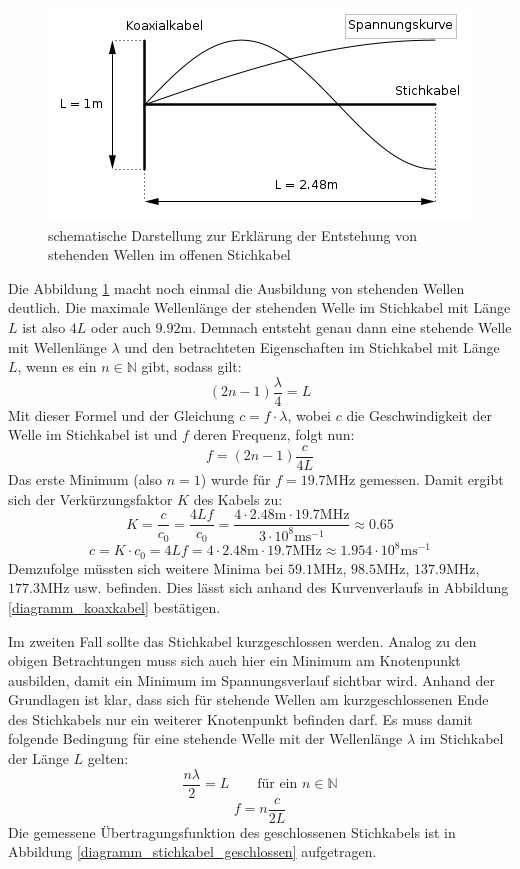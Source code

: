 		\begin{figure}[H]
			\center
			\includegraphics[scale = 0.8]{schema-02.png}
			\caption{\centering schematische Darstellung zur Erklärung der Entstehung von stehenden Wellen im offenen Stichkabel}
			\label{schema-stehende-welle}
		\end{figure}

		Die Abbildung \ref{schema-stehende-welle} macht noch einmal die Ausbildung von stehenden Wellen deutlich.
		Die maximale Wellenlänge der stehenden Welle im Stichkabel mit Länge $L$ ist also $4L$ oder auch $9.92$m.
		Demnach entsteht genau dann eine stehende Welle mit Wellenlänge $\lambda$ und den betrachteten Eigenschaften im Stichkabel mit Länge $L$, wenn es ein $n \in \mathbb{N}$ gibt, sodass gilt:
		\begin{equation}
			(2n-1)\dfrac{\lambda}{4} = L
		\end{equation}
		Mit dieser Formel und der Gleichung $c = f\cdot \lambda$, wobei $c$ die Geschwindigkeit der Welle im Stichkabel ist und $f$ deren Frequenz, folgt nun:
		\begin{equation}
			f = (2n-1)\dfrac{c}{4L}
		\end{equation}
		Das erste Minimum (also $n=1$) wurde für $f = 19.7$MHz gemessen.
		Damit ergibt sich der Verkürzungsfaktor $K$ des Kabels zu:
		\[
			K = \dfrac{c}{c_0} = \dfrac{4Lf}{c_0} = \dfrac{4\cdot 2.48\text{m} \cdot 19.7\text{MHz}}{3\cdot 10^8\text{ms}^{-1}} \approx 0.65
		\]
		\[
			c = K\cdot c_0 = 4Lf = 4\cdot 2.48\text{m} \cdot 19.7\text{MHz} \approx 1.954\cdot 10^8\text{ms}^{-1}
		\]
		Demzufolge müssten sich weitere Minima bei $59.1$MHz, $98.5$MHz, $137.9$MHz, $177.3$MHz usw. befinden.
		Dies lässt sich anhand des Kurvenverlaufs in Abbildung \ref{diagramm_koaxkabel} bestätigen.

		Im zweiten Fall sollte das Stichkabel kurzgeschlossen werden.
		Analog zu den obigen Betrachtungen muss sich auch hier ein Minimum am Knotenpunkt ausbilden, damit ein Minimum im Spannungsverlauf sichtbar wird.
		Anhand der Grundlagen ist klar, dass sich für stehende Wellen am kurzgeschlossenen Ende des Stichkabels nur ein weiterer Knotenpunkt befinden darf.
		Es muss damit folgende Bedingung für eine stehende Welle mit der Wellenlänge $\lambda$ im Stichkabel der Länge $L$ gelten:
		\begin{equation}
			\dfrac{n\lambda}{2} = L \qquad \text{für ein $n \in \mathbb{N}$}
		\end{equation}
		\begin{equation}
			f = n\dfrac{c}{2L}
		\end{equation}
		Die gemessene Übertragungsfunktion des geschlossenen Stichkabels ist in Abbildung \ref{diagramm_stichkabel_geschlossen} aufgetragen.

